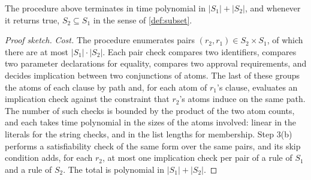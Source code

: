 \documentclass[11pt,a4paper]{article}
\begin{document}
\begin{proposition}
\label{prop:decidability}
The procedure above terminates in time polynomial in $|S_1| + |S_2|$,
and whenever it returns true, $S_2 \subseteq S_1$ in the sense of
\cref{def:subset}.
\end{proposition}

\begin{proof}[Proof sketch]
\emph{Cost.} The procedure enumerates pairs
$(r_2, r_1) \in S_2 \times S_1$, of which there are at most
$|S_1| \cdot |S_2|$. Each pair check compares two identifiers, compares
two parameter declarations for equality, compares two approval
requirements, and decides implication between two conjunctions of
atoms. The last of these groups the atoms of each clause by path and,
for each atom of $r_1$'s clause, evaluates an implication check against
the constraint that $r_2$'s atoms induce on the same path. The number of
such checks is bounded by the product of the two atom counts, and each
takes time polynomial in the sizes of the atoms involved: linear in the
literals for the string checks, and in the list lengths for
membership. Step 3(b) performs a
satisfiability check of the same form over the same pairs, and its skip
condition adds, for each $r_2$, at most one implication check per pair
of a rule of $S_1$ and a rule of $S_2$. The total is polynomial in
$|S_1| + |S_2|$.


\end{proof}
\end{document}
